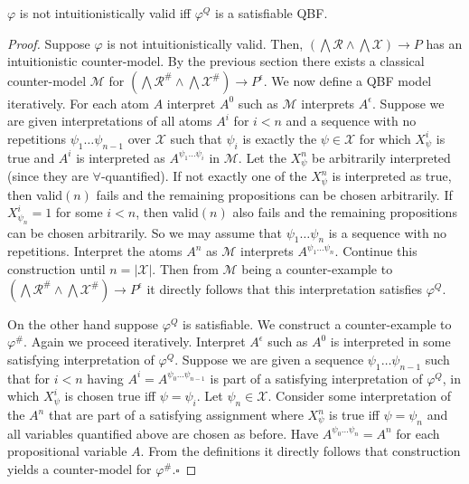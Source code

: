 \documentclass[runningheads]{llncs}
\begin{document}
\begin{lemma}\label{lemma:QBF}
	$\varphi$ is not intuitionistically valid iff $\varphi^Q$ is a satisfiable QBF.
\end{lemma}
\begin{proof}
Suppose $\varphi$ is not intuitionistically valid.
Then, $(\bigwedge\mathcal R\wedge\bigwedge\mathcal X)\to P$ has an intuitionistic counter-model. By the previous section there exists a classical counter-model $\mathcal M$ for $(\bigwedge\mathcal R^\#\wedge\bigwedge\mathcal X^\#)\to P^\epsilon$.
We now define a QBF model iteratively.
For each atom $A$ interpret $A^0$ such as $\mathcal M$ interprets $A^\epsilon$. Suppose we are given interpretations of all atoms $A^i$ for $i < n$ and a sequence with no repetitions $\psi_1\dots\psi_{n-1}$ over $\mathcal X$ such that $\psi_i$ is exactly the $\psi\in\mathcal X$ for which $X_{\psi}^i$ is true and $A^i$ is interpreted as $A^{\psi_1\dots\psi_i}$  in $\mathcal M$.
Let the $X^{n}_\psi$ be arbitrarily interpreted (since they are $\forall$-quantified). If not exactly one of the $X^{n}_\psi$ is interpreted as true, then valid$(n)$ fails and the remaining propositions can be chosen arbitrarily. If $X^i_{\psi_n} = 1$ for some $i < n$, then valid$(n)$ also fails and the remaining propositions can be chosen arbitrarily.
So we may assume that $\psi_1\dots\psi_n$ is a sequence with no repetitions.
Interpret the atoms $A^n$ as $\mathcal M$ interprets $A^{\psi_1\dots\psi_n}$.
Continue this construction until $n  = |\mathcal X|$. Then from $\mathcal M$ being a counter-example to $(\bigwedge\mathcal R^\#\wedge\bigwedge\mathcal X^\#)\to P^\epsilon$ it directly follows that this interpretation satisfies $\varphi^Q$.
	
On the other hand suppose $\varphi^Q$ is satisfiable. We construct a counter-example to $\varphi^\#$.
Again we proceed iteratively. Interpret $A^\epsilon$ such as $A^0$ is interpreted in some satisfying interpretation of $\varphi^Q$. Suppose we are given a sequence $\psi_1\dots \psi_{n-1}$ such that for $i<n$ having $A^i = A^{\psi_0\dots\psi_{n-1}}$ is part of a satisfying interpretation of $\varphi^Q$, in which $X^i_\psi$ is chosen true iff $\psi = \psi_i$. Let $\psi_n\in\mathcal X$. Consider some interpretation of the $A^n$ that are part of a satisfying assignment where $X^n_\psi$ is true iff $\psi = \psi_n$ and all variables quantified above are chosen as before. Have $A^{\psi_0\dots\psi_n} = A^n$ for each propositional variable $A$. From the definitions it directly follows that construction yields a counter-model for $\varphi^\#$.\hfill$\square$
\end{proof}
\end{document}
